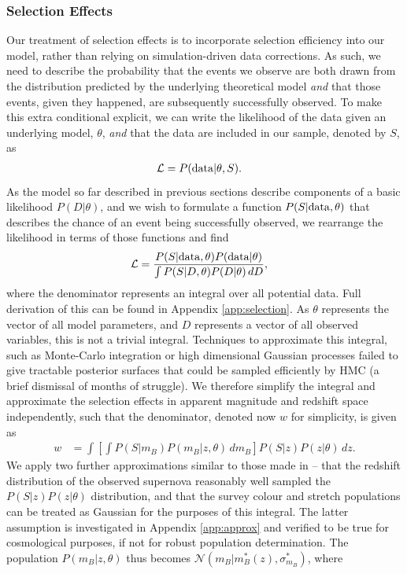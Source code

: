 \documentclass[a4paper,fleqn,usenatbib]{mnras}
\newcommand{\rubin}{\citetalias{Rubin2015}}
\begin{document}
\subsubsection{Selection Effects}
\label{sec:selection}
Our treatment of selection effects is to incorporate selection efficiency into our model, rather than relying on simulation-driven data corrections. As such, we need to describe the probability that the events we observe are both drawn from the distribution predicted by the underlying theoretical model \textit{and} that those events, given they happened, are subsequently successfully observed.  To make this extra conditional explicit, we can write the likelihood of the data given an underlying model, $\theta$, \textit{and} that the data are included in our sample, denoted by $S$, as
\begin{align}
\mathcal{L} &= P({\rm data} | \theta, S). \label{eq:like}
\end{align}
As the model so far described in previous sections describe components of a basic likelihood $P(D|\theta)$, and we wish to formulate a function $P(S|{\rm data},\theta)$ that describes the chance of an event being successfully observed, we rearrange the likelihood in terms of those functions and find
\begin{align}
\mathcal{L} &= \frac{P(S|{\rm data},\theta) P({\rm data}|\theta)}{\int P(S | D, \theta) P(D|\theta)\, dD}, \label{eq:main}
\end{align}
where the denominator represents an integral over all potential data. Full derivation of this can be found in Appendix \ref{app:selection}. As $\theta$ represents the vector of all model parameters, and $D$ represents a vector of all observed variables, this is not a trivial integral. Techniques to approximate this integral, such as Monte-Carlo integration or high dimensional Gaussian processes failed to give tractable posterior surfaces that could be sampled efficiently by HMC (a brief dismissal of months of struggle). We therefore simplify the integral and approximate the selection effects in apparent magnitude and redshift space independently, such that the denominator, denoted now $w$ for simplicity, is given as
\begin{align}
w &= \int  \left[ \int P(S|m_B) P(m_B | z, \theta)\, d m_B \right] P(S|z) P(z|\theta)\, dz. \label{eq:w1}
\end{align}
We apply two further approximations similar to those made in {\rubin} -- that the redshift distribution of the observed supernova reasonably well sampled the $P(S|z)P(z|\theta)$ distribution, and that the survey colour and stretch populations can be treated as Gaussian for the purposes of this integral. The latter assumption is investigated in Appendix \ref{app:approx} and verified to be true for cosmological purposes, if not for robust population determination. The population $P(m_B | z, \theta)$ thus becomes $\mathcal{N}(m_B|m_B^*(z), \sigma^*_{m_B})$, where
\end{document}

